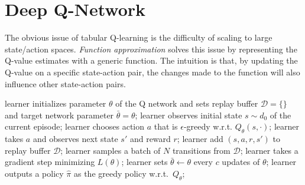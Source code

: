 \section{Deep Q-Network}
The obvious issue of tabular Q-learning is the difficulty of scaling to large state/action spaces.
{\em Function approximation} solves this issue by representing the Q-value estimates with a generic function.
The intuition is that, by updating the Q-value on a specific state-action pair, the changes made to the function will also influence other state-action pairs.
\begin{protocol}[htb]
\caption{DQN algorithm} \label{protocol:DQN}
\begin{algorithmic}[1]
\State learner initializes parameter $\theta$ of the Q network and sets replay buffer $\mathcal{D}=\{\}$ and target network parameter $\bar{\theta} = \theta$;
    \State learner observes initial state $s\sim d_0$ of the current episode; 
        \State learner chooses action $a$ that is $\epsilon$-greedy w.r.t. $Q_{\theta}(s,\cdot)$;
        \State learner takes $a$ and  observes next state $s'$ and reward $r$;
        \State learner add $(s,a,r,s')$ to replay buffer $\mathcal{D}$; 
        \State learner samples a batch of $N$ transitions from $\mathcal{D}$;
        \State learner takes a gradient step minimizing $L(\theta)$;
        \State learner sets $\bar{\theta} \gets \theta$ every $c$ updates of $\theta$; 
    \EndFor
{}
\State learner outputs a policy $\widehat{\pi}$ as the greedy policy w.r.t.~$Q_\theta$;
\end{algorithmic}
\end{protocol}

